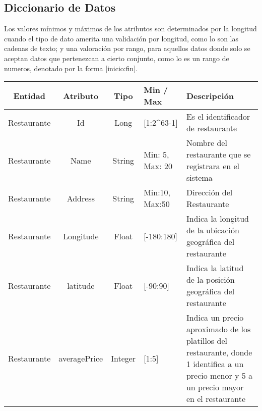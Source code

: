 \begin{landscape}
	\section{Diccionario de Datos}
	Los valores mínimos y máximos de los atributos son determinados por la longitud cuando el tipo de dato amerita una validación por longitud, como lo son las cadenas de texto; y una valoración por rango, para aquellos datos donde solo se aceptan datos que pertenezcan a cierto conjunto, como lo es un rango de numeros, denotado por la forma [inicio:fin].
	\begin{table}[h]
		\begin{center}
			\begin{tabular}{| c | c | c | p{3cm} | p{12cm}|} 
				\toprule
				Entidad     & Atributo          & Tipo    & Min / Max                                          & Descripción                                                                                                                               \\
				\midrule
				Restaurante & Id                & Long    & [1:2\^{ }63-1]                                     & Es el identificador de restaurante                                                                                                         \\
				\midrule
				Restaurante & Name              & String  & Min: 5, Max: 20                                    & Nombre del restaurante que se registrara en el sistema                                                                                     \\
				\midrule
				Restaurante & Address           & String  & Min:10, Max:50                                     & Dirección del Restaurante                                                                                                                 \\
				\midrule
				Restaurante & Longitude         & Float   & [-180:180]                                         & Indica la longitud de la ubicación geográfica del restaurante                                                                            \\
				\midrule
				Restaurante & latitude          & Float   & [-90:90]                                           & Indica la latitud de la posición geográfica del restaurante                                                                              \\
				\midrule
				Restaurante & averagePrice      & Integer & [1:5]                                              & Indica un precio aproximado de los platillos del restaurante, donde 1 identifica a un precio menor y 5 a un precio mayor en el restaurante \\

\end{tabular}
\end{center}
\end{table}
\end{landscape}
